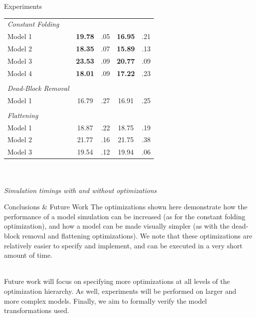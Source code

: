 \documentclass[final,hyperref={pdfpagelabels=false}]{beamer}
\begin{document}
\begin{frame}{}
\begin{columns}[t]
\begin{column}{.385\linewidth}
\begin{block}{Experiments}
\begin{table}[h]
\begin{tabular}{l | c c c c }
             \textit{Constant Folding} & & & & \\
             Model 1 & \textbf{19.78} &.05 & \textbf{16.95} & .21\\
             Model 2 & \textbf{18.35} & .07 &\textbf{ 15.89} & .13\\
             Model 3 &\textbf{ 23.53} & .09 & \textbf{20.77} & .09\\
             Model 4 & \textbf{18.01} & .09 & \textbf{17.22} & .23\\
              & & & & \\
             \textit{Dead-Block Removal} & & & & \\
             Model 1 & 16.79 & .27 & 16.91 & .25\\
              & & & & \\
             \textit{Flattening} & & & & \\
             Model 1 & 18.87 & .22 & 18.75 & .19\\
             Model 2 & 21.77 & .16 & 21.75 & .38\\
             Model 3 & 19.54 & .12 & 19.94 & .06\\
             
             \end{tabular}
             \centering
             ~\\~\\
             \footnotesize \textit{Simulation timings with and without optimizations}
             \end{table}
             \end{block}
             
             
             
             
             \begin{block}{Conclusions \& Future Work}
             \small
        	   The optimizations shown here demonstrate how the performance of a model simulation can be increased (as for the constant folding optimization), and how a model can be made visually simpler (as with the dead-block removal and flattening optimizations). We note that these optimizations are relatively easier to specify and implement, and can be executed in a very short amount of time.
        	   
        	   ~\\
        	   Future work will focus on specifying more optimizations at all levels of the optimization hierarchy. As well, experiments will be performed on larger and more complex models. Finally, we aim to formally verify the model transformations used.
             \end{block}
             

\end{column}
\end{columns}
\end{frame}
\end{document}
